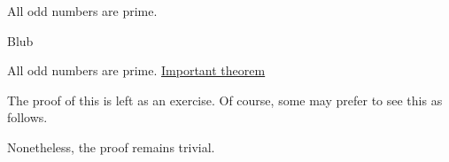\documentclass[varwidth=15cm, border=.5cm]{standalone}
\begin{document}
\begin{theorem}[label=pb8y7i3e, name=Boundedness of operators]
	All odd numbers are prime. 

	\begin{theorem}
		Blub
	\end{theorem}
\end{theorem}

\begin{theorem}[Blub]
	All odd numbers are prime. \hyperref[pb8y7i3e]{Important theorem} 

\end{theorem}

The proof of this is left as an exercise.
Of course, some may prefer to see this as follows.

Nonetheless, the proof remains trivial.
\end{document}
